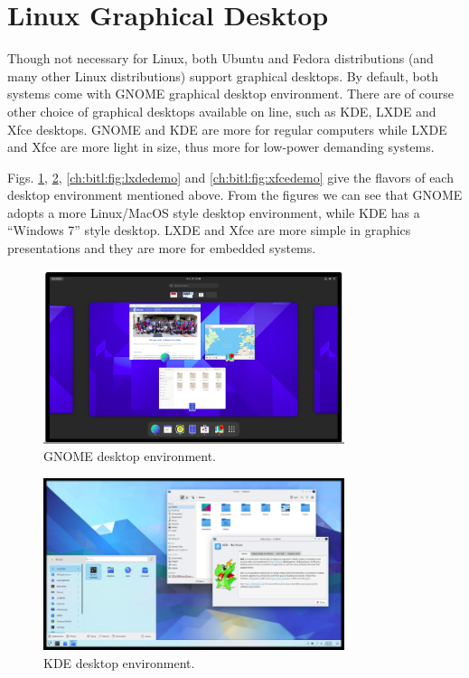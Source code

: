 \section{Linux Graphical Desktop}

Though not necessary for Linux, both Ubuntu and Fedora distributions (and many other Linux distributions) support graphical desktops. By default, both systems come with GNOME graphical desktop environment. There are of course other choice of graphical desktops available on line, such as KDE, LXDE and Xfce desktops. GNOME and KDE are more for regular computers while LXDE and Xfce are more light in size, thus more for low-power demanding systems.

Figs. \ref{ch:bitl:fig:gnomedemo}, \ref{ch:bitl:fig:kdedemo}, \ref{ch:bitl:fig:lxdedemo} and \ref{ch:bitl:fig:xfcedemo} give the flavors of each desktop environment mentioned above. From the figures we can see that GNOME adopts a more Linux/MacOS style desktop environment, while KDE has a ``Windows 7'' style desktop. LXDE and Xfce are more simple in graphics presentations and they are more for embedded systems.

\begin{figure}
	\centering
	\includegraphics[width=250pt]{chapters/ch_brief_introduction_to_linux/figures/gnome_demo.png}
	\caption{GNOME desktop environment.} \label{ch:bitl:fig:gnomedemo}
\end{figure}

\begin{figure}
	\centering
	\includegraphics[width=250pt]{chapters/ch_brief_introduction_to_linux/figures/kde_demo.png}
	\caption{KDE desktop environment.} \label{ch:bitl:fig:kdedemo}
\end{figure}

